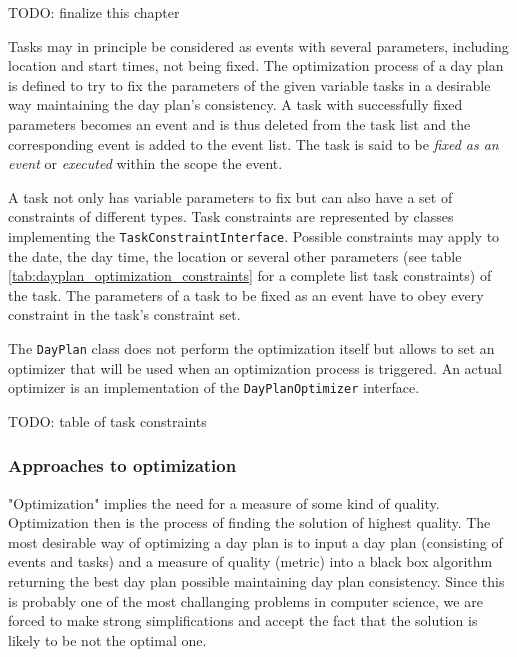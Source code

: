 TODO: finalize this chapter\newline

Tasks may in principle be considered as events with several parameters, including location and start times, not being fixed. The optimization process of a day plan is defined to try to fix the parameters of the given variable tasks in a desirable way maintaining the day plan's consistency. A task with successfully fixed parameters becomes an event and is thus deleted from the task list and the corresponding event is added to the event list. The task is said to be \emph{fixed as an event} or \emph{executed} within the scope the event.\newline

A task not only has variable parameters to fix but can also have a set of constraints of different types. Task constraints are represented by classes implementing the \texttt{TaskConstraintInterface}. Possible constraints may apply to the date, the day time, the location or several other parameters (see table \ref{tab:dayplan_optimization_constraints} for a complete list task constraints) of the task. The parameters of a task to be fixed as an event have to obey every constraint in the task's constraint set.\newline

The \texttt{DayPlan} class does not perform the optimization itself but allows to set an optimizer that will be used when an optimization process is triggered. An actual optimizer is an implementation of the \texttt{DayPlanOptimizer} interface.\newline

TODO: table of task constraints


\subsubsection{Approaches to optimization}
 
"Optimization" implies the need for a measure of some kind of quality. Optimization then is the process of finding the solution of highest quality. The most desirable way of optimizing a day plan is to input a day plan (consisting of events and tasks) and a measure of quality (metric) into a black box algorithm returning the best day plan possible maintaining day plan consistency. Since this is probably one of the most challanging problems in computer science, we are forced to make strong simplifications and accept the fact that the solution is likely to be not the optimal one.\newline

